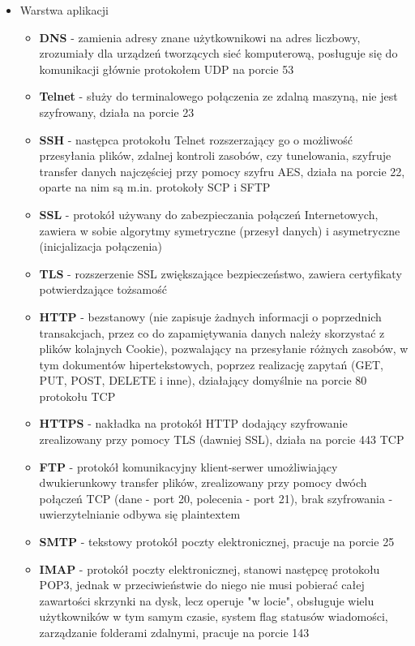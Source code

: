 \begin{itemize}
    \item Warstwa aplikacji
	\begin{itemize}
    	\item \textbf{DNS} - zamienia adresy znane użytkownikowi na adres liczbowy, zrozumiały dla urządzeń tworzących sieć komputerową, posługuje się do komunikacji głównie protokołem UDP na porcie 53
    	\item \textbf{Telnet} - służy do terminalowego połączenia ze zdalną maszyną, nie jest szyfrowany, działa na porcie 23
    	\item \textbf{SSH} - następca protokołu Telnet rozszerzający go o możliwość przesyłania plików, zdalnej kontroli zasobów, czy tunelowania, szyfruje transfer danych najczęściej przy pomocy szyfru AES, działa na porcie 22, oparte na nim są m.in. protokoły SCP i SFTP
    	\item \textbf{SSL} - protokół używany do zabezpieczania połączeń Internetowych, zawiera w sobie algorytmy symetryczne (przesył danych) i asymetryczne (inicjalizacja połączenia)
		\item \textbf{TLS} - rozszerzenie SSL zwiększające bezpieczeństwo, zawiera certyfikaty potwierdzające tożsamość
		\item \textbf{HTTP} - bezstanowy (nie zapisuje żadnych informacji o poprzednich transakcjach, przez co do zapamiętywania danych należy skorzystać z plików kolajnych Cookie), pozwalający na przesyłanie różnych zasobów, w tym dokumentów hipertekstowych, poprzez realizację zapytań (GET, PUT, POST, DELETE i inne), działający domyślnie na porcie 80 protokołu TCP
		\item \textbf{HTTPS} - nakładka na protokół HTTP dodający szyfrowanie zrealizowany przy pomocy TLS (dawniej SSL), działa na porcie 443 TCP
		\item \textbf{FTP} - protokół komunikacyjny klient-serwer umożliwiający dwukierunkowy transfer plików, zrealizowany przy pomocy dwóch połączeń TCP (dane - port 20, polecenia - port 21), brak szyfrowania - uwierzytelnianie odbywa się plaintextem 
    	\item \textbf{SMTP} - tekstowy protokół poczty elektronicznej, pracuje na porcie 25
		\item \textbf{IMAP} - protokół poczty elektronicznej, stanowi następcę protokołu POP3, jednak w przeciwieństwie do niego nie musi pobierać całej zawartości skrzynki na dysk, lecz operuje "w locie", obsługuje wielu użytkowników w tym samym czasie, system flag statusów wiadomości, zarządzanie folderami zdalnymi, pracuje na porcie 143
	\end{itemize}
\end{itemize}

